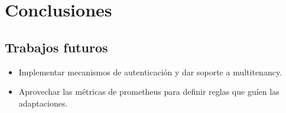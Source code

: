 \chapter{Conclusiones}
\label{chap:conclusiones}

\section{Trabajos futuros}

\begin{itemize}
  \item Implementar mecanismos de autenticación y dar soporte a multitenancy.
  \item  Aprovechar las métricas de prometheus para definir reglas que guíen las adaptaciones.
\end{itemize}
